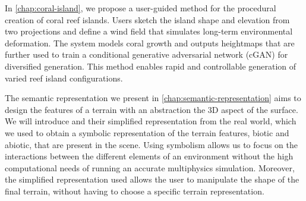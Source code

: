

In \cref{chap:coral-island}, we propose a user-guided method for the procedural creation of coral reef islands. Users sketch the island shape and elevation from two projections and define a wind field that simulates long-term environmental deformation. The system models coral growth and outputs heightmaps that are further used to train a conditional generative adversarial network (cGAN) for diversified generation. This method enables rapid and controllable generation of varied reef island configurations.

The semantic representation we present in \cref{chap:semantic-representation} aims to design the features of a terrain with an abstraction the 3D aspect of the surface. We will introduce  and their simplified representation from the real world, which we used to obtain a symbolic representation of the terrain features, biotic and abiotic, that are present in the scene. Using symbolism allows us to focus on the interactions between the different elements of an environment without the high computational needs of running an accurate multiphysics simulation. Moreover, the simplified representation used allows the user to manipulate the shape of the final terrain, without having to choose a specific terrain representation.

